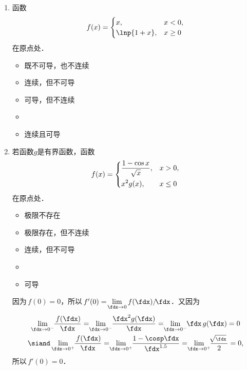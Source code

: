\begin{enumerate}
\item 函数
  \begin{equation*}
    f(x) =
    \begin{cases}
      x, & x < 0, \\
      \lnp{1+x}, & x \ge 0
    \end{cases}
  \end{equation*}
  在原点处\uline{\hspace{8em}}．
  \begin{itemize}
    \renewcommand{\labelitemi}{\faCircleThin}
  \item 既不可导，也不连续
  \item 连续，但不可导
  \item 可导，但不连续
    \ifshowsol
  \item[\faCircle]
    \else
  \item
    \fi
    连续且可导
  \end{itemize}

\item 若函数\(g\)是有界函数，函数
  \begin{equation*}
    f(x) =
    \begin{dcases}
      \frac{1 - \cos x}{\sqrt x}, & x > 0, \\
      x^2 g(x), & x \le 0
    \end{dcases}
  \end{equation*}
  在原点处\uline{\hspace{8em}}．
  \begin{itemize}
    \renewcommand{\labelitemi}{\faCircleThin}
  \item 极限不存在
  \item 极限存在，但不连续
  \item 连续，但不可导
    \ifshowsol
  \item[\faCircle]
    \else
  \item
    \fi
    可导
  \end{itemize}

  \ifshowsol
  因为\(\,f(0) = 0\)，所以\(\,f'(0) = \!\lim\limits_{\fdx\to0} f(\fdx)/\!\fdx\)．又因为
  \begin{gather*}
    \lim_{\fdx\to0^-}\negthickspace\frac{\,f(\fdx)}{\fdx}
    = \negthickspace\lim_{\fdx\to0^-}\negthickspace\frac{\fdx^2 g(\fdx)}{\fdx}
    = \negthickspace\lim_{\fdx\to0^-}\negthickspace\fdx\,g(\fdx)
    = 0 \\
    \siand
    \lim_{\fdx\to0^+}\negthickspace\frac{\,f(\fdx)}{\fdx}
    = \negthickspace\lim_{\fdx\to0^+}\negthickspace\frac{1-\cosp\fdx}{\fdx^{1.5}}
    = \negthickspace\lim_{\fdx\to0^+}\negthickspace\frac{\!\sqrt{\scriptstyle\fdx}\,}{2}
    = 0,
  \end{gather*}
  所以\(\,f'(0) = 0\)．
  \fi


\end{enumerate}
